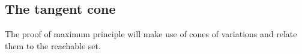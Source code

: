 
\subsection{The tangent cone}
The proof of maximum principle will make use of cones of variations and relate them to the reachable set. \\

